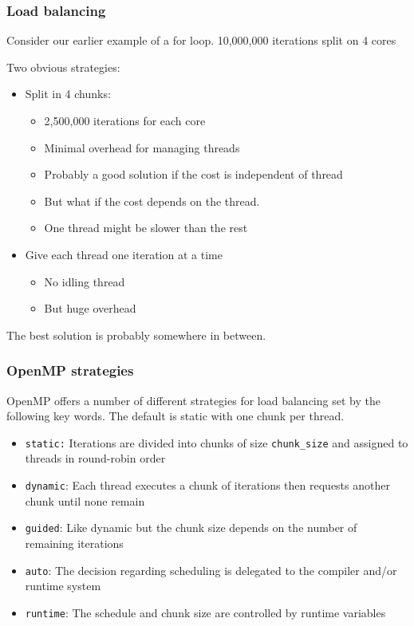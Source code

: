 \subsubsection{Load balancing}\label{load-balancing}

Consider our earlier example of a for loop. 10,000,000 iterations split
on 4 cores

Two obvious strategies:

\begin{itemize}
\itemsep1pt\parskip0pt
\item
  Split in 4 chunks:

  \begin{itemize}
  \itemsep1pt\parskip0pt
  \item
    2,500,000 iterations for each core
  \item
    Minimal overhead for managing threads
  \item
    Probably a good solution if the cost is independent of thread
  \item
    But what if the cost depends on the thread.
  \item
    One thread might be slower than the rest
  \end{itemize}
\item
  Give each thread one iteration at a time

  \begin{itemize}
  \itemsep1pt\parskip0pt
  \item
    No idling thread
  \item
    But huge overhead
  \end{itemize}
\end{itemize}

The best solution is probably somewhere in between.

\subsubsection{OpenMP strategies}\label{openmp-strategies}

OpenMP offers a number of different strategies for load balancing set by
the following key words. The default is static with one chunk per
thread.

\begin{itemize}
\itemsep1pt\parskip0pt
\item
  \texttt{static:} Iterations are divided into chunks of size
  \texttt{chunk\_size} and assigned to threads in round-robin order
\item
  \texttt{dynamic}: Each thread executes a chunk of iterations then
  requests another chunk until none remain
\item
  \texttt{guided}: Like dynamic but the chunk size depends on the number
  of remaining iterations
\item
  \texttt{auto}: The decision regarding scheduling is delegated to the
  compiler and/or runtime system
\item
  \texttt{runtime}: The schedule and chunk size are controlled by
  runtime variables
\end{itemize}

